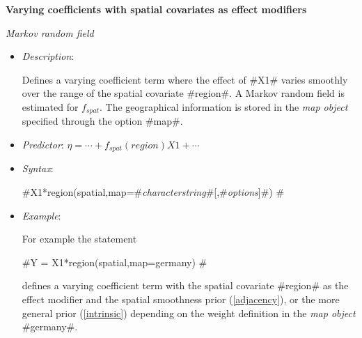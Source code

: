 {\bf Varying coefficients with spatial covariates as effect
modifiers} \medskip

{\em Markov random field}

\begin{itemize}
\item[] {\em Description}:

Defines a varying coefficient term where the effect of #X1# varies
smoothly over the range of the spatial covariate #region#. A
Markov random field is estimated for $f_{spat}$. The geographical
information is stored in the {\em map object} specified through
the option #map#.
\item[] {\em Predictor}: $\eta = \cdots + f_{spat}(region)X1 + \cdots$
\item[] {\em Syntax}:

#X1*region(spatial,map=#{\em characterstring}#[,#{\em options}]#) #
\item[] {\em Example}:

For example the statement

#Y = X1*region(spatial,map=germany) #

defines a varying coefficient term with the spatial covariate
#region# as the effect modifier and the spatial smoothness prior
(\ref{adjacency}), or the more general prior (\ref{intrinsic})
depending on the weight definition in the {\em map object}
#germany#.
\end{itemize}






